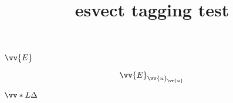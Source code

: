 \documentclass{article}
\title{esvect tagging test}
\begin{document}
$\vv{E}$

\[\vv{E}_{\vv{u}_{\vv{u}}}\]

$\vv*{L}{\Delta}$
\end{document}
